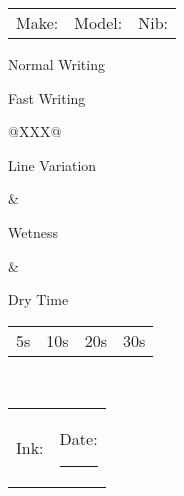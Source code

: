 \documentclass[letterpaper,12pt]{memoir}
\begin{document}
\begin{tabularx}{\textwidth}{@{}XXX@{}}
Make: \textcolor{lightgray}{\hrulefill} & Model: \textcolor{lightgray}{\hrulefill} & Nib: \textcolor{lightgray}{\hrulefill}
\end{tabularx}

\begin{prettyframed}{Normal Writing}
  \vspace{0.75in}
\end{prettyframed}

\begin{prettyframed}{Fast Writing}
  \vspace{0.75in}
\end{prettyframed}

\begin{tabularx}{\textwidth}{@{}XXX@{}}
  \begin{prettyframed}{Line Variation}
    \begin{minipage}[t][1.5in][t]{\textwidth}
      \begin{vplace}[0.2]
      \end{vplace}
    \end{minipage}
  \end{prettyframed} &
                       \begin{prettyframed}{Wetness}
                         \begin{minipage}[t][1.5in][t]{\textwidth}

                         \end{minipage}
                       \end{prettyframed} &
                                            \begin{prettyframed}{Dry Time}
                                              \begin{minipage}[t][1.5in][t]{\textwidth}
                                                {\begin{tabularx}{\textwidth}{cXXX}
                                                   5s & 10s & 20s & 30s
                                                 \end{tabularx}}
                                              \end{minipage}
                                            \end{prettyframed} \\
\end{tabularx}

\vspace{\fill}

\begin{tabularx}{\textwidth}{@{}X r@{}}
Ink: \textcolor{lightgray}{\hrulefill} & Date: \textcolor{lightgray}{\rule{5cm}{0.4pt}}
\end{tabularx}
\end{document}
